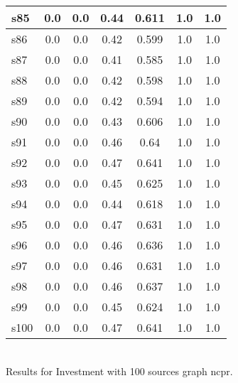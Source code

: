 \documentclass{article}
\begin{document}
\begin{tabular}{|l|c|c|c|c|c|c|}
\hline
s85 &0.0 & 0.0 & 0.44 & 0.611 & 1.0 & 1.0\\
\hline
s86 &0.0 & 0.0 & 0.42 & 0.599 & 1.0 & 1.0\\
\hline
s87 &0.0 & 0.0 & 0.41 & 0.585 & 1.0 & 1.0\\
\hline
s88 &0.0 & 0.0 & 0.42 & 0.598 & 1.0 & 1.0\\
\hline
s89 &0.0 & 0.0 & 0.42 & 0.594 & 1.0 & 1.0\\
\hline
s90 &0.0 & 0.0 & 0.43 & 0.606 & 1.0 & 1.0\\
\hline
s91 &0.0 & 0.0 & 0.46 & 0.64 & 1.0 & 1.0\\
\hline
s92 &0.0 & 0.0 & 0.47 & 0.641 & 1.0 & 1.0\\
\hline
s93 &0.0 & 0.0 & 0.45 & 0.625 & 1.0 & 1.0\\
\hline
s94 &0.0 & 0.0 & 0.44 & 0.618 & 1.0 & 1.0\\
\hline
s95 &0.0 & 0.0 & 0.47 & 0.631 & 1.0 & 1.0\\
\hline
s96 &0.0 & 0.0 & 0.46 & 0.636 & 1.0 & 1.0\\
\hline
s97 &0.0 & 0.0 & 0.46 & 0.631 & 1.0 & 1.0\\
\hline
s98 &0.0 & 0.0 & 0.46 & 0.637 & 1.0 & 1.0\\
\hline
s99 &0.0 & 0.0 & 0.45 & 0.624 & 1.0 & 1.0\\
\hline
s100 &0.0 & 0.0 & 0.47 & 0.641 & 1.0 & 1.0\\
\hline
\end{tabular}\\

\noindent Results for Investment with 100 sources graph ncpr.
\end{document}
